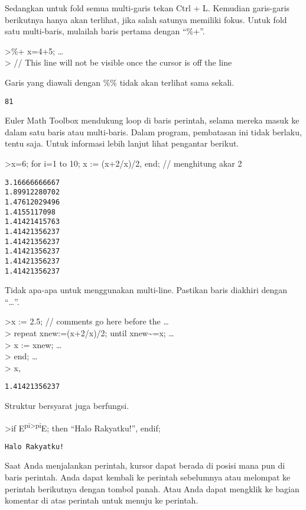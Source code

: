 \documentclass[
]{book}
\begin{document}
Sedangkan untuk fold semua multi-garis tekan Ctrl + L. Kemudian garis-garis berikutnya hanya akan terlihat, jika salah satunya memiliki fokus. Untuk fold satu multi-baris, mulailah baris pertama dengan ``\%+''.

\textgreater\%+ x=4+5; \ldots{}\\
\textgreater{} // This line will not be visible once the cursor is off the line

Garis yang diawali dengan \%\% tidak akan terlihat sama sekali.

\begin{verbatim}
81
\end{verbatim}

Euler Math Toolbox mendukung loop di baris perintah, selama mereka masuk ke dalam satu baris atau multi-baris. Dalam program, pembatasan ini tidak berlaku, tentu saja. Untuk informasi lebih lanjut lihat pengantar berikut.

\textgreater x=6; for i=1 to 10; x := (x+2/x)/2, end; // menghitung akar 2

\begin{verbatim}
3.16666666667
1.89912280702
1.47612029496
1.4155117098
1.41421415763
1.41421356237
1.41421356237
1.41421356237
1.41421356237
1.41421356237
\end{verbatim}

Tidak apa-apa untuk menggunakan multi-line. Pastikan baris diakhiri dengan ``\ldots{}''.

\textgreater x := 2.5; // comments go here before the \ldots{}\\
\textgreater{} repeat xnew:=(x+2/x)/2; until xnew\textasciitilde=x; \ldots{}\\
\textgreater{} x := xnew; \ldots{}\\
\textgreater{} end; \ldots{}\\
\textgreater{} x,

\begin{verbatim}
1.41421356237
\end{verbatim}

Struktur bersyarat juga berfungsi.

\textgreater if E\textsuperscript{pi\textgreater pi}E; then ``Halo Rakyatku!'', endif;

\begin{verbatim}
Halo Rakyatku!
\end{verbatim}

Saat Anda menjalankan perintah, kursor dapat berada di posisi mana pun di baris perintah. Anda dapat kembali ke perintah sebelumnya atau melompat ke perintah berikutnya dengan tombol panah. Atau Anda dapat mengklik ke bagian komentar di atas perintah untuk menuju ke perintah.
\end{document}
